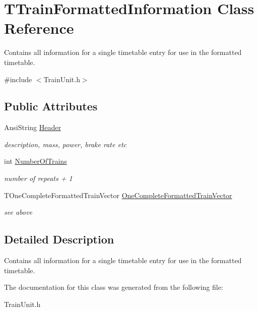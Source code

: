 \hypertarget{class_t_train_formatted_information}{}\section{T\+Train\+Formatted\+Information Class Reference}
\label{class_t_train_formatted_information}


Contains all information for a single timetable entry for use in the formatted timetable.  




{\ttfamily \#include $<$Train\+Unit.\+h$>$}

\subsection*{Public Attributes}
\begin{DoxyCompactItemize}
\item 
\mbox{\label{class_t_train_formatted_information_a03b72f64d740876d99d1080b8d355441}} 
Ansi\+String \mbox{\hyperlink{class_t_train_formatted_information_a03b72f64d740876d99d1080b8d355441}{Header}}
\begin{DoxyCompactList}\small\item\em description, mass, power, brake rate etc \end{DoxyCompactList}\item 
\mbox{\label{class_t_train_formatted_information_a2f5bc8f1ff9b154a381660639c40dada}} 
int \mbox{\hyperlink{class_t_train_formatted_information_a2f5bc8f1ff9b154a381660639c40dada}{Number\+Of\+Trains}}
\begin{DoxyCompactList}\small\item\em number of repeats + 1 \end{DoxyCompactList}\item 
\mbox{\label{class_t_train_formatted_information_a7ed8168782c7afd5f7b42b41f5515c8f}} 
T\+One\+Complete\+Formatted\+Train\+Vector \mbox{\hyperlink{class_t_train_formatted_information_a7ed8168782c7afd5f7b42b41f5515c8f}{One\+Complete\+Formatted\+Train\+Vector}}
\begin{DoxyCompactList}\small\item\em see above \end{DoxyCompactList}\end{DoxyCompactItemize}


\subsection{Detailed Description}
Contains all information for a single timetable entry for use in the formatted timetable. 

The documentation for this class was generated from the following file\+:\begin{DoxyCompactItemize}
\item 
Train\+Unit.\+h\end{DoxyCompactItemize}
